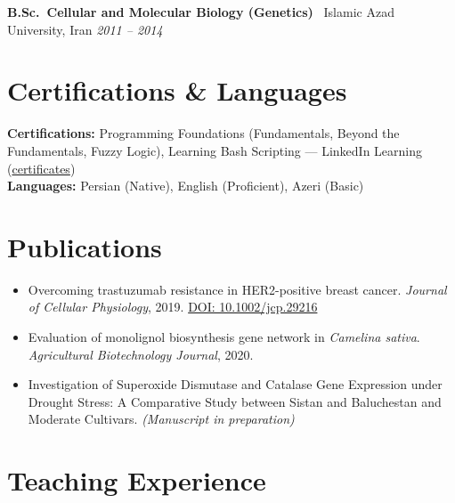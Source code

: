 \documentclass[10pt, a4paper]{article}
\newcommand{\cventry}[4]{%
  \noindent
  \textbf{#2} \textbar\ #3, #4 \hfill \textit{#1}\par\vspace{0pt}
}
\begin{document}
\vspace{1pt}

\cventry{2011 -- 2014}
  {B.Sc.\ Cellular and Molecular Biology (Genetics)}
  {Islamic Azad University}
  {Iran}

\section{Certifications \& Languages}

\noindent\textbf{Certifications:} Programming Foundations (Fundamentals, Beyond the Fundamentals, Fuzzy Logic),
Learning Bash Scripting --- LinkedIn Learning
(\href{https://github.com/mortezasabri/mortezasabri.github.io/tree/main/certificates}{certificates})\\[1pt]
\noindent\textbf{Languages:} Persian (Native), English (Proficient), Azeri (Basic)

\section{Publications}

\begin{itemize}
  \item Overcoming trastuzumab resistance in HER2-positive breast cancer.
        \textit{Journal of Cellular Physiology}, 2019.
        \href{https://doi.org/10.1002/jcp.29216}{DOI: 10.1002/jcp.29216}

  \item Evaluation of monolignol biosynthesis gene network in \textit{Camelina sativa}.
        \textit{Agricultural Biotechnology Journal}, 2020.

  \item Investigation of Superoxide Dismutase and Catalase Gene Expression under Drought Stress:
        A Comparative Study between Sistan and Baluchestan and Moderate Cultivars.
        \textit{(Manuscript in preparation)}
\end{itemize}

\section{Teaching Experience}
\end{document}
